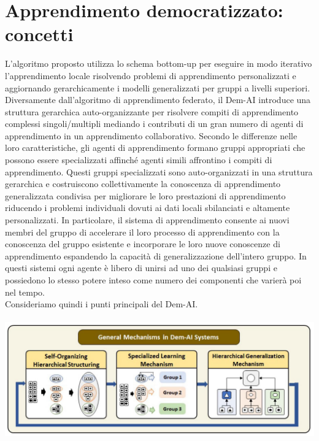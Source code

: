 \chapter{Apprendimento democratizzato: concetti}\label{ch:chapter2}
L'algoritmo proposto utilizza lo schema bottom-up per eseguire in modo iterativo l'apprendimento locale risolvendo problemi di apprendimento personalizzati e aggiornando gerarchicamente i modelli generalizzati per gruppi a livelli superiori.\\
Diversamente dall'algoritmo di apprendimento federato, il Dem-AI introduce una struttura gerarchica auto-organizzante per risolvere compiti di apprendimento complessi singoli/multipli mediando i contributi di un gran numero di agenti di apprendimento in un apprendimento collaborativo. Secondo le differenze nelle loro caratteristiche, gli agenti di apprendimento formano gruppi appropriati che possono essere specializzati affinché agenti simili affrontino i compiti di apprendimento. Questi gruppi specializzati sono auto-organizzati in una struttura gerarchica e costruiscono collettivamente la conoscenza di apprendimento generalizzata condivisa per migliorare le loro prestazioni di apprendimento riducendo i problemi individuali dovuti ai dati locali sbilanciati e altamente personalizzati. In particolare, il sistema di apprendimento consente ai nuovi membri del gruppo di accelerare il loro processo di apprendimento con la conoscenza del gruppo esistente e incorporare le loro nuove conoscenze di apprendimento espandendo la capacità di generalizzazione dell'intero gruppo. In questi sistemi ogni agente è libero di unirsi ad uno dei qualsiasi gruppi e possiedono lo stesso potere inteso come numero dei componenti che varierà poi nel tempo.\\
Consideriamo quindi i punti principali del Dem-AI.\\\\
\includegraphics[scale=0.25]{DemIA}
 \vspace{0.5cm}


